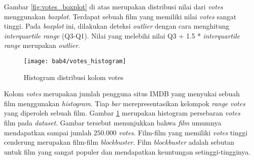 Gambar \ref{fig:votes_boxplot} di atas merupakan distribusi nilai dari \textit{votes} menggunakan \textit{boxplot}. Terdapat sebuah film yang memiliki nilai \textit{votes} sangat tinggi. Pada \textit{boxplot} ini, dilakukan deteksi \textit{outlier} dengan cara menghitung \textit{interquartile range} (Q3-Q1). Nilai yang melebihi nilai Q3 + 1.5 * \textit{interquartile range} merupakan \textit{outlier}.


\begin{figure}[H]
	\centering  
	\texttt{[image: bab4/votes\_histogram]}   
	\caption{Histogram distribusi kolom votes}
	\label{fig:votes_histogram} 
\end{figure} 

Kolom \textit{votes} merupakan jumlah pengguna situs IMDB yang menyukai sebuah film menggunakan \textit{histogram}. Tiap \textit{bar} merepresentasikan kelompok \textit{range} \textit{votes} yang diperoleh sebuah film. Gambar \ref{fig:votes_histogram} merupakan histogram persebaran \textit{votes} film pada \textit{dataset}. Gambar tersebut menunjukkan bahwa \textit{film} umumnya mendapatkan sampai jumlah $250.000$ \textit{votes}. Film-film yang memiliki \textit{votes} tinggi cenderung merupakan film-film \textit{blockbuster}. Film \textit{blockbuster} adalah sebutan untuk film yang sangat populer dan mendapatkan keuntungan setinggi-tingginya.

